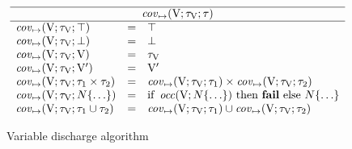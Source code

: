 \begin{figure}
\footnotesize
\centering
\begin{minipage}{.7\linewidth}
\begin{algorithm}[H]

\end{algorithm}  
\end{minipage}
\[
\begin{array}{lcl}
    \hline
    \multicolumn{3}{c}{\covsubstdflt{\ty}} \\ 
    \hline 
    \covsubstdflt{\tyany} &=& \tyany\\
    \covsubstdflt{\tybot} &=& \tybot\\
    \covsubstdflt{\vany} &=& \ty_{\vany}\\
    \covsubstdflt{\vany'} &=& \vany'\\
    \covsubstdflt{\typair{\ty_1}{\ty_2}} &=& 
        \typair{\covsubstdflt{\ty_1}}{\covsubstdflt{\ty_2}}\\
    \covsubstdflt{\tyinv\iname{\ldots}} &=&
        \text{if } \occdflt{\tyinv\iname{\ldots}}
        \text{ then } \failure
        \text{ else } \tyinv\iname{\ldots}\\
    \covsubstdflt{\tyunion{\ty_1}{\ty_2}} &=& 
        \tyunion{\covsubstdflt{\ty_1}}{\covsubstdflt{\ty_2}}\\
\end{array}
\]
\caption{Variable discharge algorithm \dischctrdflt}\label{fig:ctr-discharge}      
\end{figure}

